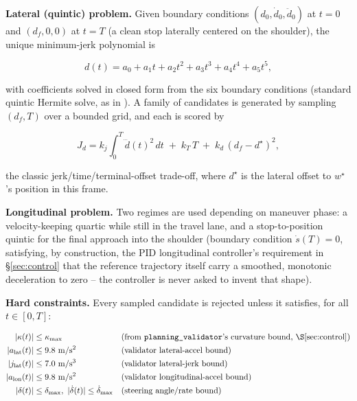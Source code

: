 \documentclass[11pt]{article}
\newcommand{\pkg}[1]{\texttt{#1}}
\begin{document}
\textbf{Lateral (quintic) problem.} Given boundary conditions
$(d_0, \dot d_0, \ddot d_0)$ at $t=0$ and $(d_f, 0, 0)$ at $t=T$ (a clean stop laterally centered on
the shoulder), the unique minimum-jerk polynomial is

\begin{equation}
d(t) = a_0 + a_1 t + a_2 t^2 + a_3 t^3 + a_4 t^4 + a_5 t^5,
\end{equation}

with coefficients solved in closed form from the six boundary conditions (standard quintic Hermite
solve, as in \cite{werling2010frenet}). A family of candidates is generated by sampling
$(d_f, T)$ over a bounded grid, and each is scored by

\begin{equation}
\label{eq:latcost}
J_{d} = k_j \!\int_0^T \! \dddot d(t)^2\, dt \;+\; k_T\, T \;+\; k_d\, (d_f - d^\star)^2,
\end{equation}

the classic jerk/time/terminal-offset trade-off, where $d^\star$ is the lateral offset to
$w^\star$'s position in this frame.

\textbf{Longitudinal problem.} Two regimes are used depending on maneuver phase: a
velocity-keeping quartic while still in the travel lane, and a stop-to-position quintic for the
final approach into the shoulder (boundary condition $\dot s(T) = 0$, satisfying, by construction,
the PID longitudinal controller's requirement in \S\ref{sec:control} that the reference trajectory
itself carry a smoothed, monotonic deceleration to zero -- the controller is never asked to invent
that shape).

\textbf{Hard constraints.} Every sampled candidate is rejected unless it satisfies, for all
$t \in [0,T]$:

\begin{align}
|\kappa(t)| &\leq \kappa_{\max} && \text{(from \pkg{planning\_validator}'s curvature bound, \S\ref{sec:control})}\\
|a_{\text{lat}}(t)| &\leq 9.8\ \mathrm{m/s^2} && \text{(validator lateral-accel bound)}\\
|j_{\text{lat}}(t)| &\leq 7.0\ \mathrm{m/s^3} && \text{(validator lateral-jerk bound)}\\
|a_{\text{lon}}(t)| &\leq 9.8\ \mathrm{m/s^2} && \text{(validator longitudinal-accel bound)}\\
|\delta(t)| &\leq \delta_{\max},\ |\dot\delta(t)| \leq \dot\delta_{\max} && \text{(steering angle/rate bound)}
\end{align}
\end{document}
